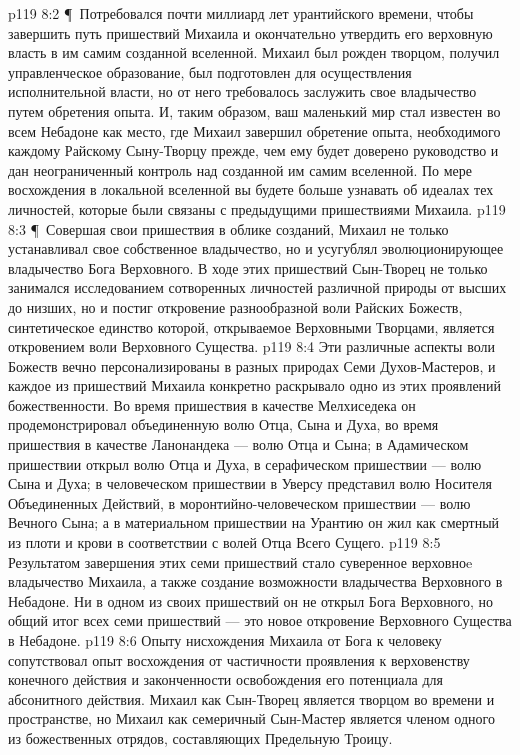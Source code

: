 \vs p119 8:2 \P\ Потребовался почти миллиард лет урантийского времени, чтобы завершить путь пришествий Михаила и окончательно утвердить его верховную власть в им самим созданной вселенной. Михаил был рожден творцом, получил управленческое образование, был подготовлен для осуществления исполнительной власти, но от него требовалось заслужить свое владычество путем обретения опыта. И, таким образом, ваш маленький мир стал известен во всем Небадоне как место, где Михаил завершил обретение опыта, необходимого каждому Райскому Сыну\hyp{}Творцу прежде, чем ему будет доверено руководство и дан неограниченный контроль над созданной им самим вселенной. По мере восхождения в локальной вселенной вы будете больше узнавать об идеалах тех личностей, которые были связаны с предыдущими пришествиями Михаила.
\vs p119 8:3 \P\ Совершая свои пришествия в облике созданий, Михаил не только устанавливал свое собственное владычество, но и усугублял эволюционирующее владычество Бога Верховного. В ходе этих пришествий Сын\hyp{}Творец не только занимался исследованием сотворенных личностей различной природы от высших до низших, но и постиг откровение разнообразной воли Райских Божеств, синтетическое единство которой, открываемое Верховными Творцами, является откровением воли Верховного Существа.
\vs p119 8:4 Эти различные аспекты воли Божеств вечно персонализированы в разных природах Семи Духов\hyp{}Мастеров, и каждое из пришествий Михаила конкретно раскрывало одно из этих проявлений божественности. Во время пришествия в качестве Мелхиседека он продемонстрировал объединенную волю Отца, Сына и Духа, во время пришествия в качестве Ланонандека --- волю Отца и Сына; в Адамическом пришествии открыл волю Отца и Духа, в серафическом пришествии --- волю Сына и Духа; в человеческом пришествии в Уверсу представил волю Носителя Объединенных Действий, в моронтийно\hyp{}человеческом пришествии --- волю Вечного Сына; а в материальном пришествии на Урантию он жил как смертный из плоти и крови в соответствии с волей Отца Всего Сущего.
\vs p119 8:5 Результатом завершения этих семи пришествий стало суверенное верховноe владычество Михаила, а также создание возможности владычества Верховного в Небадоне. Ни в одном из своих пришествий он не открыл Бога Верховного, но общий итог всех семи пришествий --- это новое откровение Верховного Существа в Небадоне.
\vs p119 8:6 Опыту нисхождения Михаила от Бога к человеку сопутствовал опыт восхождения от частичности проявления к верховенству конечного действия и законченности освобождения его потенциала для абсонитного действия. Михаил как Сын\hyp{}Творец является творцом во времени и пространстве, но Михаил как семеричный Сын\hyp{}Мастер является членом одного из божественных отрядов, составляющих Предельную Троицу.
